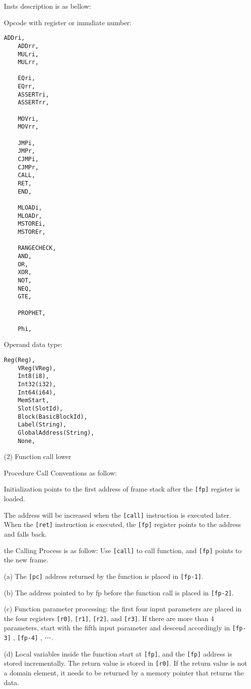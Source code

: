 \begin{itemize}
Insts description is as bellow:

Opcode with register or immdiate number:
\begin{lstlisting}[language={}]
    ADDri,
    ADDrr,
    MULri,
    MULrr,

    EQri,
    EQrr,
    ASSERTri,
    ASSERTrr,

    MOVri,
    MOVrr,

    JMPi,
    JMPr,
    CJMPi,
    CJMPr,
    CALL,
    RET,
    END,

    MLOADi,
    MLOADr,
    MSTOREi,
    MSTOREr,

    RANGECHECK,
    AND,
    OR,
    XOR,
    NOT,
    NEQ,
    GTE,

    PROPHET,

    Phi,
\end{lstlisting}

Operand data type:
\begin{lstlisting}[language={}]
    Reg(Reg),
    VReg(VReg),
    Int8(i8),
    Int32(i32),
    Int64(i64),
    MemStart,
    Slot(SlotId),
    Block(BasicBlockId),
    Label(String),
    GlobalAddress(String),
    None,
\end{lstlisting}


(2) Function call lower
    
Procedure Call Conventions as follow:

Initialization points to the first address of frame stack after the \texttt{[fp]} register is loaded.
    
The address will be increased when the \texttt{[call]}  instruction is executed later. When the \texttt{[ret]} instruction is executed, the \texttt{[fp]} register points to the address and falls back.
    
    
the Calling Process is as follow:
    Use  \texttt{[call]} to call function, and \texttt{[fp]} points to the new frame.\par
    (a) The \texttt{[pc]} address returned by the function is placed in \texttt{[fp-1]}.\par
    (b) The address pointed to by fp before the function call is placed in  \texttt{[fp-2]}.\par
    (c) Function parameter processing: the first four input parameters are placed in the four registers \texttt{[r0]}, \texttt{[r1]}, \texttt{[r2]}, and \texttt{[r3]}. If there are more than 4 parameters, start with the fifth input parameter and descend accordingly in \texttt{[fp-3]} , \texttt{[fp-4]} , ⋯. \par
    (d) Local variables inside the function start at \texttt{[fp]}, and the \texttt{[fp]} address is stored incrementally. The return value is stored in \texttt{[r0]}. If the return value is not a domain element, it needs to be returned by a memory pointer that returns the data.\par
    

\end{itemize}
